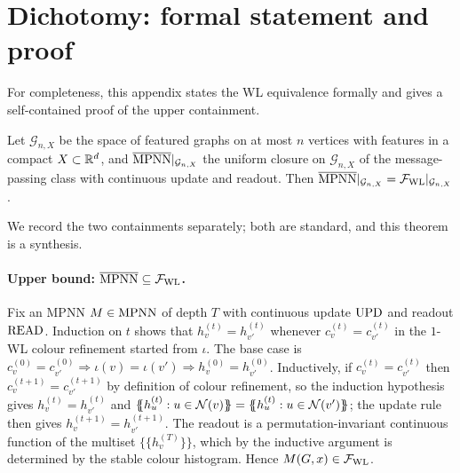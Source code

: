
\section{Dichotomy: formal statement and proof}\label{app:dichotomy}

For completeness, this appendix states the WL equivalence formally
and gives a self-contained proof of the upper containment.

\begin{theorem}\label{thm:dichotomy}
Let $\mathcal{G}_{n,X}$ be the space of featured graphs on at most
$n$ vertices with features in a compact $X \subset \mathbb{R}^d$, and
$\overline{\mathrm{MPNN}}|_{\mathcal{G}_{n,X}}$ the uniform closure on
$\mathcal{G}_{n,X}$ of the message-passing class with continuous
update and readout. Then
$\overline{\mathrm{MPNN}}|_{\mathcal{G}_{n,X}} =
\mathcal{F}_{\mathrm{WL}}|_{\mathcal{G}_{n,X}}$.
\end{theorem}

We record the two containments separately; both are standard, and
this theorem is a synthesis.

\paragraph{Upper bound: $\overline{\mathrm{MPNN}} \subseteq \mathcal{F}_{\mathrm{WL}}$.}
Fix an MPNN $M \in \mathrm{MPNN}$ of depth $T$ with continuous update $\mathrm{UPD}$
and readout $\mathrm{READ}$. Induction on $t$ shows that
$h^{(t)}_v = h^{(t)}_{v'}$ whenever $c^{(t)}_v = c^{(t)}_{v'}$ in the
$1$-WL colour refinement started from $\iota$. The base case is
$c^{(0)}_v = c^{(0)}_{v'} \Rightarrow \iota(v) = \iota(v')
\Rightarrow h^{(0)}_v = h^{(0)}_{v'}$. Inductively, if
$c^{(t)}_v = c^{(t)}_{v'}$ then $c^{(t+1)}_v = c^{(t+1)}_{v'}$ by
definition of colour refinement, so the induction hypothesis gives
$h^{(t)}_v = h^{(t)}_{v'}$ and
$\{\!\!\{h^{(t)}_u : u \in \neigh{v}\}\!\!\} =
\{\!\!\{h^{(t)}_u : u \in \neigh{v'}\}\!\!\}$; the update rule then
gives $h^{(t+1)}_v = h^{(t+1)}_{v'}$. The readout is a
permutation-invariant continuous function of the multiset
$\{\!\!\{h^{(T)}_v\}\!\!\}$, which by the inductive argument is
determined by the stable colour histogram. Hence
$M(G, x) \in \mathcal{F}_{\mathrm{WL}}$.

